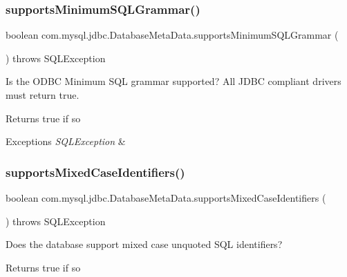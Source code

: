 \subsubsection{\texorpdfstring{supports\+Minimum\+S\+Q\+L\+Grammar()}{supportsMinimumSQLGrammar()}}
{\footnotesize\ttfamily boolean com.\+mysql.\+jdbc.\+Database\+Meta\+Data.\+supports\+Minimum\+S\+Q\+L\+Grammar (\begin{DoxyParamCaption}{ }\end{DoxyParamCaption}) throws S\+Q\+L\+Exception}

Is the O\+D\+BC Minimum S\+QL grammar supported? All J\+D\+BC compliant drivers must return true.

\begin{DoxyReturn}{Returns}
true if so 
\end{DoxyReturn}

\begin{DoxyExceptions}{Exceptions}
{\em S\+Q\+L\+Exception} & \\
\hline
\end{DoxyExceptions}
\mbox{\label{classcom_1_1mysql_1_1jdbc_1_1_database_meta_data_ade3fcbd03cbcbc25ba3cccf0a5461350}} 
\subsubsection{\texorpdfstring{supports\+Mixed\+Case\+Identifiers()}{supportsMixedCaseIdentifiers()}}
{\footnotesize\ttfamily boolean com.\+mysql.\+jdbc.\+Database\+Meta\+Data.\+supports\+Mixed\+Case\+Identifiers (\begin{DoxyParamCaption}{ }\end{DoxyParamCaption}) throws S\+Q\+L\+Exception}

Does the database support mixed case unquoted S\+QL identifiers?

\begin{DoxyReturn}{Returns}
true if so 
\end{DoxyReturn}


